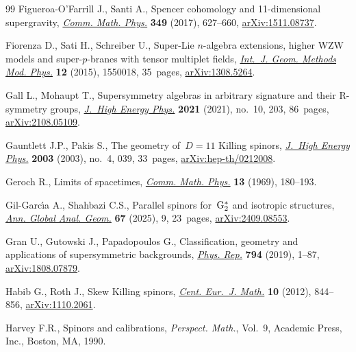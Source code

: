 \documentclass[10pt,a4paper]{amsart}
\numberwithin{equation}{section}
\newcommand{\1}{\mathbbm{1}}
\begin{document}
\begin{thebibliography}{99}
Figueroa-O'Farrill J., Santi A., Spencer cohomology and 11-dimensional
 supergravity, \href{https://doi.org/10.1007/s00220-016-2700-1}{\textit{Comm.
 Math. Phys.}} \textbf{349} (2017), 627--660,
 \href{http://arxiv.org/abs/1511.08737}{arXiv:1511.08737}.

Fiorenza D., Sati H., Schreiber U., Super-{L}ie {$n$}-algebra extensions,
 higher {WZW} models and super-{$p$}-branes with tensor multiplet fields,
 \href{https://doi.org/10.1142/S0219887815500188}{\textit{Int.~J. Geom.
 Methods Mod. Phys.}} \textbf{12} (2015), 1550018, 35~pages,
 \href{http://arxiv.org/abs/1308.5264}{arXiv:1308.5264}.

Gall L., Mohaupt T., Supersymmetry algebras in arbitrary signature and their
 {R}-symmetry groups,
 \href{https://doi.org/10.1007/jhep10(2021)203}{\textit{J.~High Energy Phys.}}
 \textbf{2021} (2021), no.~10, 203, 86~pages,
 \href{http://arxiv.org/abs/2108.05109}{arXiv:2108.05109}.

Gauntlett J.P., Pakis S., The geometry of~{$D=11$} {K}illing spinors,
 \href{https://doi.org/10.1088/1126-6708/2003/04/039}{\textit{J.~High Energy
 Phys.}} \textbf{2003} (2003), no.~4, 039, 33~pages,
 \href{http://arxiv.org/abs/hep-th/0212008}{arXiv:hep-th/0212008}.

Geroch R., Limits of spacetimes,
 \href{https://doi.org/10.1007/BF01645486}{\textit{Comm. Math. Phys.}}
 \textbf{13} (1969), 180--193.

Gil-Garc\'{\i}a A., Shahbazi C.S., Parallel spinors for~{${\rm G}_2^*$} and
 isotropic structures,
 \href{https://doi.org/10.1007/s10455-025-09987-y}{\textit{Ann. Global Anal.
 Geom.}} \textbf{67} (2025), 9, 23~pages,
 \href{http://arxiv.org/abs/2409.08553}{arXiv:2409.08553}.

Gran U., Gutowski J., Papadopoulos G., Classification, geometry and
 applications of supersymmetric backgrounds,
 \href{https://doi.org/10.1016/j.physrep.2018.11.005}{\textit{Phys. Rep.}}
 \textbf{794} (2019), 1--87,
 \href{http://arxiv.org/abs/1808.07879}{arXiv:1808.07879}.

Habib G., Roth J., Skew {K}illing spinors,
 \href{https://doi.org/10.2478/s11533-012-0029-3}{\textit{Cent. Eur.~J.
 Math.}} \textbf{10} (2012), 844--856,
 \href{http://arxiv.org/abs/1110.2061}{arXiv:1110.2061}.

Harvey F.R., Spinors and calibrations, \textit{Perspect. Math.}, Vol.~9,
 Academic Press, Inc., Boston, MA, 1990.


\end{thebibliography}
\end{document}
